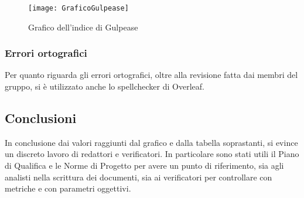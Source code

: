 \newpage
\begin{figure}[htp]
    \centering
    \texttt{[image: GraficoGulpease]}
    \caption{Grafico dell'indice di Gulpease}
    \label{fig:img-valori-gulpease}
\end{figure}


\subsubsection{Errori ortografici}

Per quanto riguarda gli errori ortografici, oltre alla revisione fatta dai membri del gruppo, si è utilizzato anche lo spellchecker di Overleaf.


\subsection{Conclusioni}

In conclusione dai valori raggiunti dal grafico e dalla tabella soprastanti, si evince un discreto lavoro di redattori e verificatori. In particolare sono stati utili il Piano di Qualifica e le Norme di Progetto per avere un punto di riferimento, sia agli analisti nella scrittura dei documenti, sia ai verificatori per controllare con metriche e con parametri oggettivi.


